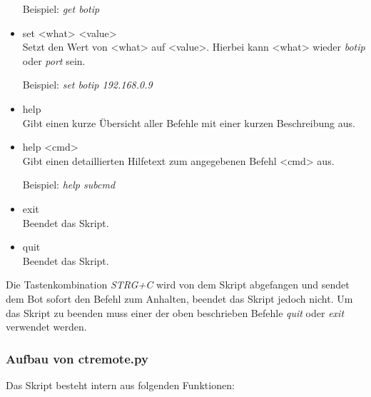 \begin{itemize}
    Beispiel: \textit{get botip}
    \item set <what> <value>\\
    Setzt den Wert von <what> auf <value>. Hierbei kann <what> wieder \textit{botip} oder \textit{port} sein.
    
    Beispiel: \textit{set botip 192.168.0.9}
    \item help\\
    Gibt einen kurze Übersicht aller Befehle mit einer kurzen Beschreibung aus.
    \item help <cmd>\\
    Gibt einen detaillierten Hilfetext zum angegebenen Befehl <cmd> aus.
    
    Beispiel: \textit{help subcmd}
    \item exit\\
    Beendet das Skript.
    \item quit\\
    Beendet das Skript.
\end{itemize}
Die Tastenkombination \textit{STRG+C} wird von dem Skript abgefangen und sendet dem Bot sofort den Befehl zum Anhalten, beendet das Skript jedoch nicht. Um das Skript zu beenden muss einer der oben beschrieben Befehle \textit{quit} oder \textit{exit} verwendet werden.

\subsubsection{Aufbau von ctremote.py}
Das Skript besteht intern aus folgenden Funktionen:

